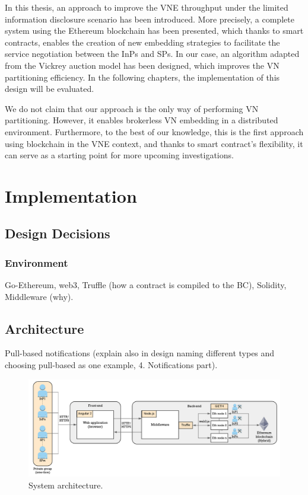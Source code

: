 In this thesis, an approach to improve the VNE throughput under the limited information disclosure scenario has been introduced. More precisely, a complete system using the Ethereum blockchain has been presented, which thanks to smart contracts, enables the creation of new embedding strategies to facilitate the service negotiation between the InPs and SPs. In our case, an algorithm adapted from the Vickrey auction model has been designed, which improves the VN partitioning efficiency. In the following chapters, the implementation of this design will be evaluated.

We do not claim that our approach is the only way of performing VN partitioning. However, it enables brokerless VN embedding in a distributed environment. Furthermore, to the best of our knowledge, this is the first approach using blockchain in the VNE context, and thanks to smart contract's flexibility, it can serve as a starting point for more upcoming investigations.

\chapter{Implementation}
\label{ch:implementation}

\section{Design Decisions}


\subsection{Environment}

Go-Ethereum, web3, Truffle (how a contract is compiled to the BC), Solidity, Middleware (why).


\section{Architecture} \label{architecture}

Pull-based notifications (explain also in design naming different types and choosing pull-based as one example, 4. Notifications part).

\begin{figure}[bth]
	\centering
	\includegraphics[width=1\linewidth]{gfx/Implementation_architecture}    
  	\caption{System architecture.}
  	\label{fig:archi}
\end{figure}

